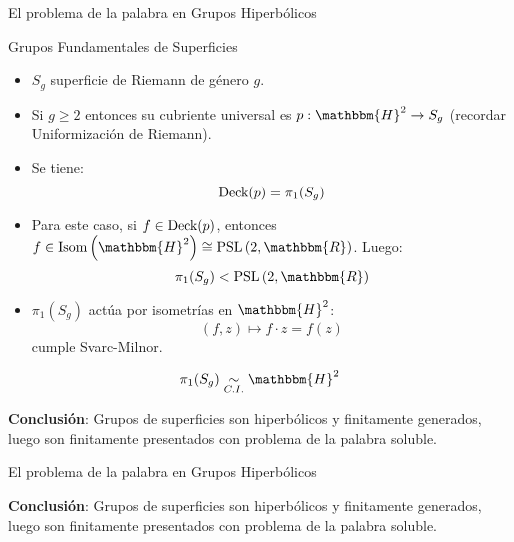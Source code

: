 \documentclass[xcolor=dvipsnames,aspectratio=159]{beamer}
\theoremstyle{largebreak}
\newcommand\cf[3]{\ensuremath{#1:#2\rightarrow#3}}
\newcommand{\bbm}[1]{\ensuremath{\mathbbm{#1}}}
\newcommand{\Isom}[1]{\ensuremath{\textup{Isom}\left(#1\right)}}
\newcommand{\qisom}{\ensuremath{\underset{C.I.}{\sim}}}
\newcommand{\PSL}[1]{\ensuremath{\textup{PSL}\left(#1\right)}}
\begin{document}
\begin{frame}{El problema de la palabra en Grupos Hiperbólicos}
    \begin{center}
        \Large Grupos Fundamentales de Superficies
    \end{center}
    
    \normalsize
    
    \pause
    
    \begin{itemize}
        \item $S_g$ superficie de Riemann de género $g$.
        \item Si $g\geq 2$ entonces su cubriente universal es $\cf{p}{\bbm{H}^2}{S_g}$ (recordar Uniformización de Riemann).
        \item Se tiene:
        \begin{equation*}
            \textup{Deck}(p)=\pi_1(S_g)
        \end{equation*}
        \item Para este caso, si $f\in\textup{Deck}(p)$, entonces $f\in\Isom{\bbm{H}^2}\cong\PSL{2,\bbm{R}}$. Luego:
        \begin{equation*}
            \pi_1(S_g)<\PSL{2,\bbm{R}}
        \end{equation*}
        \pause
        \item $\pi_1(S_g)$ actúa por isometrías en $\bbm{H}^2$:
        \begin{equation*}
            (f,z)\mapsto f\cdot z= f(z)
        \end{equation*}
        cumple Svarc-Milnor.
    \end{itemize}

    \pause

    \begin{equation*}
        \pi_1(S_g)\qisom \bbm{H}^2
    \end{equation*}

    \begin{center}
        \textbf{Conclusión}: Grupos de superficies son hiperbólicos y finitamente generados, luego son finitamente presentados con problema de la palabra soluble.
    \end{center}

\end{frame}

\begin{frame}{El problema de la palabra en Grupos Hiperbólicos}
    \begin{center}
        \Large \textbf{Conclusión}: Grupos de superficies son hiperbólicos y finitamente generados, luego son finitamente presentados con problema de la palabra soluble.
    \end{center}
\end{frame}
\end{document}

